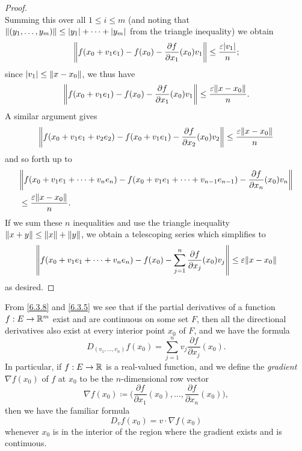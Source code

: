 \begin{proof}
\[  \]
  Summing this over all \(1 \leq i \leq m\) (and noting that \(\norm*{(y_1, \dots, y_m)} \leq \abs{y_1} + \dots + \abs{y_m}\) from the triangle inequality) we obtain
  \[
    \norm*{f(x_0 + v_1 e_1) - f(x_0) - \frac{\partial f}{\partial x_1}(x_0) v_1} \leq \frac{\varepsilon \abs{v_1}}{n};
  \]
  since \(\abs{v_1} \leq \norm*{x - x_0}\), we thus have
  \[
    \norm*{f(x_0 + v_1 e_1) - f(x_0) - \frac{\partial f}{\partial x_1}(x_0) v_1} \leq \frac{\varepsilon \norm*{x - x_0}}{n}.
  \]
  A similar argument gives
  \[
    \norm*{f(x_0 + v_1 e_1 + v_2 e_2) - f(x_0 + v_1 e_1) - \frac{\partial f}{\partial x_2}(x_0) v_2} \leq \frac{\varepsilon \norm*{x - x_0}}{n}
  \]
  and so forth up to
  \begin{align*}
     & \norm*{f(x_0 + v_1 e_1 + \dots + v_n e_n) - f(x_0 + v_1 e_1 + \dots + v_{n - 1} e_{n - 1}) - \frac{\partial f}{\partial x_n}(x_0) v_n} \\
     & \leq \frac{\varepsilon \norm*{x - x_0}}{n}.
  \end{align*}
  If we sum these \(n\) inequalities and use the triangle inequality \(\norm*{x + y} \leq \norm*{x} + \norm*{y}\), we obtain a telescoping series which simplifies to
  \[
    \norm*{f(x_0 + v_1 e_1 + \dots + v_n e_n) - f(x_0) - \sum_{j = 1}^n \frac{\partial f}{\partial x_j}(x_0) v_j} \leq \varepsilon \norm*{x - x_0}
  \]
  as desired.
\end{proof}

\begin{ac}\label{ac:6.3.3}
  From \cref{6.3.8} and \cref{6.3.5} we see that if the partial derivatives of a function \(f : E \to \R^m\) exist and are continuous on some set \(F\), then all the directional derivatives also exist at every interior point \(x_0\) of \(F\), and we have the formula
  \[
    D_{(v_1, \dots, v_n)} f(x_0) = \sum_{j = 1}^n v_j \frac{\partial f}{\partial x_j}(x_0).
  \]
  In particular, if \(f : E \to \R\) is a real-valued function, and we define the \emph{gradient} \(\nabla f(x_0)\) of \(f\) at \(x_0\) to be the \(n\)-dimensional row vector
  \[
    \nabla f(x_0) \coloneqq \bigg(\frac{\partial f}{\partial x_1}(x_0), \dots, \frac{\partial f}{\partial x_n}(x_0)\bigg),
  \]
  then we have the familiar formula
  \[
    D_v f(x_0) = v \cdot \nabla f(x_0)
  \]
  whenever \(x_0\) is in the interior of the region where the gradient exists and is continuous.
\end{ac}

